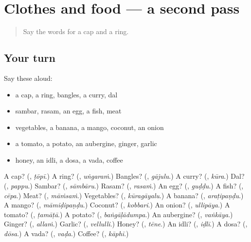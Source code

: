 \section[(dialogue)]{Clothes and food — a second pass}

\label{lesson:TE-R119-second-pass-clothes-and-food}



\begin{quote}
Say the words for a cap and a ring.
\end{quote}

\subsection*{Your turn}
Say these aloud:

\begin{itemize}
\raggedright
  \item a cap, a ring, bangles, a curry, dal
  \item sambar, rasam, an egg, a fish, meat
  \item vegetables, a banana, a mango, coconut, an onion
  \item a tomato, a potato, an aubergine, ginger, garlic
  \item honey, an idli, a dosa, a vada, coffee
\end{itemize}

\begin{tcolorbox}[breakable,colback=teal!4,colframe=teal!35!black,title={Before you move on}]
A cap? (\textbf{}, \emph{ṭōpī}.) A ring? (\textbf{}, \emph{uṅgaraṁ}.) Bangles? (\textbf{}, \emph{gājulu}.) A curry? (\textbf{}, \emph{kūra}.) Dal? (\textbf{}, \emph{pappu}.) Sambar? (\textbf{}, \emph{sāmbāru}.) Rasam? (\textbf{}, \emph{rasaṁ}.) An egg? (\textbf{}, \emph{guḍḍu}.) A fish? (\textbf{}, \emph{cēpa}.) Meat? (\textbf{}, \emph{māṁsaṁ}.) Vegetables? (\textbf{}, \emph{kūragāyalu}.) A banana? (\textbf{}, \emph{araṭipaṇḍu}.) A mango? (\textbf{}, \emph{māmiḍipaṇḍu}.) Coconut? (\textbf{}, \emph{kobbari}.) An onion? (\textbf{}, \emph{ullipāya}.) A tomato? (\textbf{}, \emph{ṭamāṭā}.) A potato? (\textbf{}, \emph{baṅgāḷādumpa}.) An aubergine? (\textbf{}, \emph{vaṅkāya}.) Ginger? (\textbf{}, \emph{allaṁ}.) Garlic? (\textbf{}, \emph{vellulli}.) Honey? (\textbf{}, \emph{tēne}.) An idli? (\textbf{}, \emph{iḍlī}.) A dosa? (\textbf{}, \emph{dōsa}.) A vada? (\textbf{}, \emph{vaḍa}.) Coffee? (\textbf{}, \emph{kāphī}.)
\end{tcolorbox}
